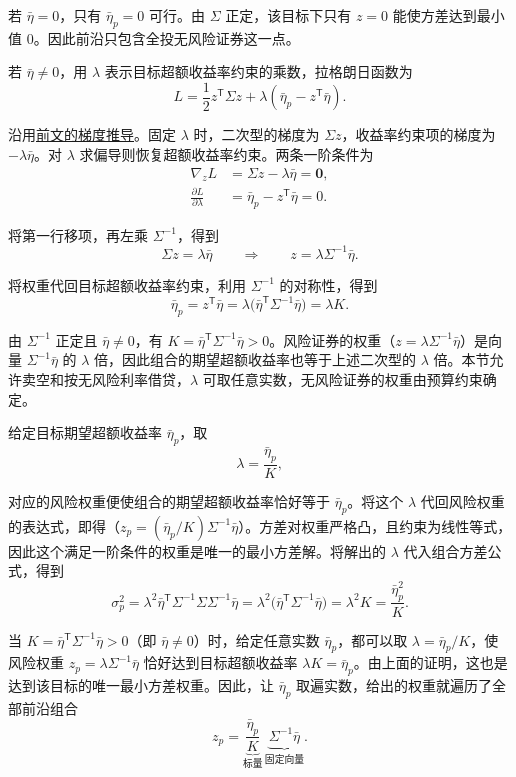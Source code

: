 \begin{solution}[label-content={证明},blank-type=none]
若 $\bar\eta=0$，只有 $\bar\eta_p=0$ 可行。由 $\Sigma$ 正定，该目标下只有 $z=0$ 能使方差达到最小值 $0$。因此前沿只包含全投无风险证券这一点。

若 $\bar\eta\ne0$，用 $\lambda$ 表示目标超额收益率约束的乘数，拉格朗日函数为
\[
 L=\frac12 z^{\mathsf T}\Sigma z+\lambda(\bar\eta_p-z^{\mathsf T}\bar\eta).
\]

沿用\hyperlink{wj-12-frontier-gradient}{\textcolor{WJReferenceColor}{前文的梯度推导}}。固定 $\lambda$ 时，二次型的梯度为 $\Sigma z$，收益率约束项的梯度为 $-\lambda\bar\eta$。对 $\lambda$ 求偏导则恢复超额收益率约束。两条一阶条件为
\[
 \begin{aligned}
 \nabla_z L &= \Sigma z-\lambda\bar\eta=\mathbf 0,\\
 \frac{\partial L}{\partial\lambda} &= \bar\eta_p-z^{\mathsf T}\bar\eta=0.
 \end{aligned}
\]

将第一行移项，再左乘 $\Sigma^{-1}$，得到
\[
 \Sigma z=\lambda\bar\eta \qquad  \Rightarrow \qquad z=\lambda\Sigma^{-1}\bar\eta.
\]

将权重代回目标超额收益率约束，利用 $\Sigma^{-1}$ 的对称性，得到
\[
 \bar\eta_p=z^{\mathsf T}\bar\eta
 =\lambda\bigl(\bar\eta^{\mathsf T}\Sigma^{-1}\bar\eta\bigr)=\lambda K.
\]

由 $\Sigma^{-1}$ 正定且 $\bar\eta\ne0$，有 $K=\bar\eta^{\mathsf T}\Sigma^{-1}\bar\eta>0$。风险证券的权重（$z=\lambda\Sigma^{-1}\bar\eta$）是向量 $\Sigma^{-1}\bar\eta$ 的 $\lambda$ 倍，因此组合的期望超额收益率也等于上述二次型的 $\lambda$ 倍。本节允许卖空和按无风险利率借贷，$\lambda$ 可取任意实数，无风险证券的权重由预算约束确定。

给定目标期望超额收益率 $\bar\eta_p$，取
\[
 \lambda=\frac{\bar\eta_p}{K},
\]

对应的风险权重便使组合的期望超额收益率恰好等于 $\bar\eta_p$。将这个 $\lambda$ 代回风险权重的表达式，即得（$z_p=(\bar\eta_p/K)\Sigma^{-1}\bar\eta$）。方差对权重严格凸，且约束为线性等式，因此这个满足一阶条件的权重是唯一的最小方差解。将解出的 $\lambda$ 代入组合方差公式，得到
\[
 \sigma_p^2
 =\lambda^2\bar\eta^{\mathsf T}\Sigma^{-1}\Sigma\Sigma^{-1}\bar\eta
 =\lambda^2\bigl(\bar\eta^{\mathsf T}\Sigma^{-1}\bar\eta\bigr)
 =\lambda^2 K=\frac{\bar\eta_p^2}{K}.
\]
\end{solution}

当 $K=\bar\eta^{\mathsf T}\Sigma^{-1}\bar\eta>0$（即 $\bar\eta\ne0$）时，给定任意实数 $\bar\eta_p$，都可以取 $\lambda=\bar\eta_p/K$，使风险权重 $z_p=\lambda\Sigma^{-1}\bar\eta$ 恰好达到目标超额收益率 $\lambda K=\bar\eta_p$。由上面的证明，这也是达到该目标的唯一最小方差权重。因此，让 $\bar\eta_p$ 取遍实数，给出的权重就遍历了全部前沿组合
\[
 z_p=\underbrace{\frac{\bar\eta_p}{K}}_{\text{标量}}
      \,\underbrace{\Sigma^{-1}\bar\eta}_{\text{固定向量}}.
\]

